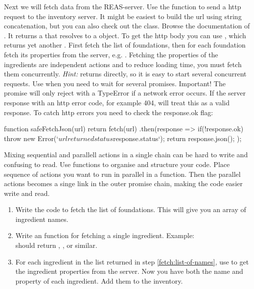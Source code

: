 \documentclass[fleqn, article, a4paper]{memoir}
\begin{document}
\begin{Assignments}
\item Next we will fetch data from the REAS-server. Use the  function to send a http request to the inventory server. It might be easiest to build the url using string concatenation, but you can also check out the  class. Browse the documentation of . It returns a  that resolves to a  object. To get the http body you can use , which returns yet another . First fetch the list of foundations, then for each foundation fetch its properties from the server, e.g. . Fetching the properties of the ingredients are independent actions and to reduce loading time, you must fetch them concurrently. \emph{Hint:}  returns directly, so it is easy to start several concurrent requests. Use  when you need to wait for several promises. Important! The   promise will only reject with a TypeError if a network error occurs. If the server response with an http error code, for example 404,  will treat this as a valid response. To catch http errors you need to check the response.ok flag:
\begin{Code}
function safeFetchJson(url) {
  return fetch(url)
  .then(response => {
    if(!response.ok) {
      throw new Error(`${url} returned status ${response.status}`);
    }
    return response.json();
  });
}
\end{Code}
Mixing sequential and parallell actions in a single  chain can be hard to write and confusing to read. Use functions to organise and structure your code. Place sequence of actions you want to run in parallel in a function. Then the parallel actions becomes a singe link in the outer promise chain, making the code easier write and read. 
\begin{enumerate}
\item \label{fetch:list-of-names}Write the code to fetch the list of foundations. This will give you an array of ingredient names.
\item Write an  function for fetching a single ingredient. Example:\\  should return , , or similar.
\item \label{fetch:build-category} For each ingredient in the list returned in step \ref{fetch:list-of-names}, use  to get the ingredient properties from the server. Now you have both the name and property of each ingredient. Add them to the inventory.

\end{enumerate}
\end{Assignments}
\end{document}

